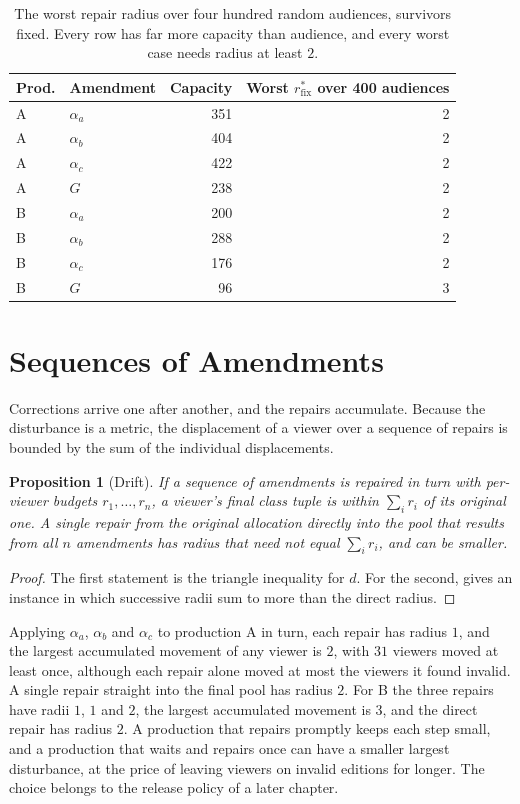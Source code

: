 \documentclass[11pt,twoside,openright]{book}
\theoremstyle{plain}
\newtheorem{proposition}[theorem]{Proposition}
\theoremstyle{definition}
\theoremstyle{remark}
\begin{document}
\begin{table}[ht]
\centering
\begin{tabular}{@{}llrr@{}}
\toprule
Prod. & Amendment & Capacity & Worst $r^\ast_{\mathrm{fix}}$ over 400 audiences\\
\midrule
A & $\alpha_a$ & 351 & 2\\
A & $\alpha_b$ & 404 & 2\\
A & $\alpha_c$ & 422 & 2\\
A & $G$ & 238 & 2\\
B & $\alpha_a$ & 200 & 2\\
B & $\alpha_b$ & 288 & 2\\
B & $\alpha_c$ & 176 & 2\\
B & $G$ & 96 & 3\\
\bottomrule
\end{tabular}
\caption{The worst repair radius over four hundred random audiences, survivors fixed. Every row has far more capacity than audience, and every worst case needs radius at least $2$.}\label{tab:worst}
\end{table}

\section{Sequences of Amendments}\label{sec:drift}

Corrections arrive one after another, and the repairs accumulate. Because the disturbance is a metric, the displacement of a viewer over a sequence of repairs is bounded by the sum of the individual displacements.

\begin{proposition}[Drift]\label{prop:drift}
If a sequence of amendments is repaired in turn with per-viewer budgets $r_1,\dots,r_n$, a viewer's final class tuple is within $\sum_ir_i$ of its original one. A single repair from the original allocation directly into the pool that results from all $n$ amendments has radius that need not equal $\sum_ir_i$, and can be smaller.
\end{proposition}

\begin{proof}
The first statement is the triangle inequality for $d$. For the second,  gives an instance in which successive radii sum to more than the direct radius.
\end{proof}

Applying $\alpha_a$, $\alpha_b$ and $\alpha_c$ to production A in turn, each repair has radius $1$, and the largest accumulated movement of any viewer is $2$, with $31$ viewers moved at least once, although each repair alone moved at most the viewers it found invalid. A single repair straight into the final pool has radius $2$. For B the three repairs have radii $1$, $1$ and $2$, the largest accumulated movement is $3$, and the direct repair has radius $2$. A production that repairs promptly keeps each step small, and a production that waits and repairs once can have a smaller largest disturbance, at the price of leaving viewers on invalid editions for longer. The choice belongs to the release policy of a later chapter.
\end{document}

